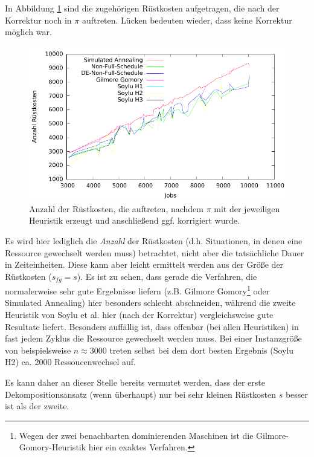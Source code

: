 \documentclass{scrreprt}
\begin{document}
In Abbildung \ref{abb:kbcoplot} sind die zugehörigen Rüstkosten aufgetragen, die nach der Korrektur noch in $\pi$ auftreten.
Lücken bedeuten wieder, dass keine Korrektur möglich war.
\begin{figure}
    \begin{center}
        \includegraphics[width=.8\textwidth]{../prog/heuristics/plots/kbcoplot.pdf}
    \end{center}
    \caption{
        \label{abb:kbcoplot}
        Anzahl der Rüstkosten, die auftreten, nachdem $\pi$ mit der jeweiligen Heuristik erzeugt und anschließend ggf. korrigiert wurde.
    }
\end{figure}
Es wird hier lediglich die \textit{Anzahl} der Rüstkosten (d.h. Situationen, in denen eine Ressource gewechselt werden muss) betrachtet, 
nicht aber die tatsächliche Dauer in Zeiteinheiten. Diese kann aber leicht ermittelt werden aus der Größe der Rüstkosten ($s_{fg}=s$).
Es ist zu sehen, dass gerade die Verfahren, die normalerweise sehr gute Ergebnisse liefern (z.B. Gilmore Gomory\footnote{
Wegen der zwei benachbarten dominierenden Maschinen ist die Gilmore-Gomory-Heuristik hier ein exaktes Verfahren.} oder Simulated Annealing)
hier besonders schlecht abschneiden, während die zweite Heuristik von Soylu et al. hier (nach der Korrektur) vergleichsweise gute Resultate liefert.
Besonders auffällig ist, dass offenbar (bei allen Heuristiken) in fast jedem Zyklus die Ressource gewechselt werden muss.
Bei einer Instanzgröße von beispielsweise $n\approx 3000$ treten selbst bei dem dort besten Ergebnis (Soylu H2) ca. 2000 Ressoucenwechsel auf.

Es kann daher an dieser Stelle bereits vermutet werden, dass der erste Dekompositionsansatz (wenn überhaupt) nur bei sehr kleinen Rüstkosten $s$
besser ist als der zweite.
\end{document}
